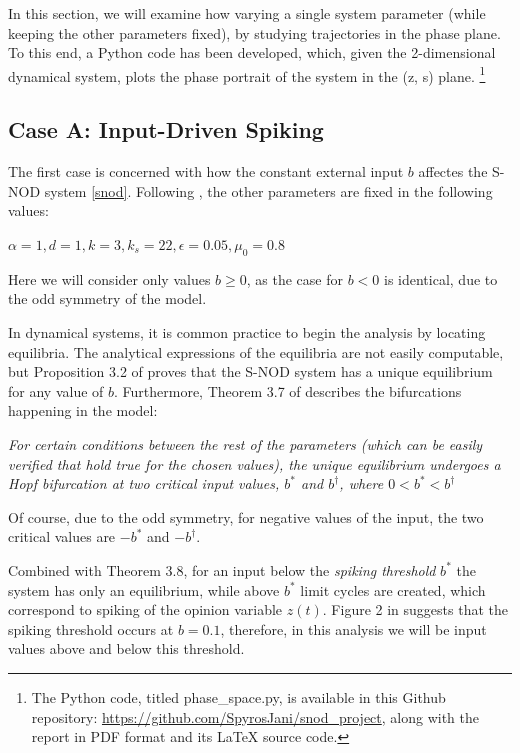 \documentclass[12pt]{article}
\begin{document}
In this section, we will examine how varying a single system parameter (while keeping the other parameters fixed), 
by studying trajectories in the phase plane. To this end, a Python code has been developed, which, given the
2-dimensional dynamical system, plots the phase portrait of the system in the (z, s) plane.
\footnote{The Python code, titled phase\_space.py, is available in this Github repository: 
\url{https://github.com/SpyrosJani/snod_project}, along with the report in PDF format and its LaTeX source code.} 

\subsection{Case A: Input-Driven Spiking}

The first case is concerned with how the constant external input $b$ affectes the S-NOD system \ref{snod}. Following 
\cite{Belaustegui2025}, the other parameters are fixed in the following values: 
\begin{center}
    \begin{math}
        \alpha = 1, d = 1, k = 3, k_s = 22, \epsilon = 0.05, \mu_0 = 0.8 
    \end{math}
\end{center}
Here we will consider only values $b \ge 0$, as the case for $b < 0$ is identical, 
due to the odd symmetry of the model.  

In dynamical systems, it is common practice to begin the analysis by locating equilibria. The analytical expressions 
of the equilibria are not easily computable, but Proposition 3.2 of \cite{Belaustegui2025} proves that the S-NOD 
system has a unique equilibrium for any value of $b$. Furthermore, Theorem 3.7 of \cite{Belaustegui2025} describes 
the bifurcations happening in the model: 
\begin{center}
    \textit{For certain conditions between the rest of the parameters (which can be easily verified that hold true for the 
    chosen values), the unique equilibrium undergoes a Hopf bifurcation at two critical input values, $b^{*}$ and $b^{\dag}$, 
    where $0 < b^{*} < b^{\dag}$}
\end{center}
Of course, due to the odd symmetry, for negative values of the input, the two critical values are $-b^{*}$ and $-b^{\dag}$.

Combined with Theorem 3.8, for an input below the \emph{spiking threshold} $b^{*}$ the system has only 
an equilibrium, while above $b^{*}$ limit cycles are created, which correspond to spiking of the opinion variable $z(t)$.
Figure 2 in \cite{Belaustegui2025} suggests that the spiking threshold occurs at $b = 0.1$, therefore, in this analysis 
we will be input values above and below this threshold. 
\end{document}
